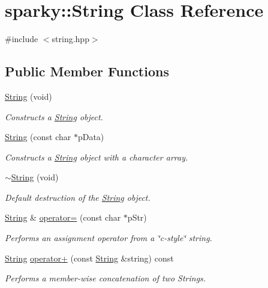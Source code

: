 \hypertarget{classsparky_1_1_string}{}\section{sparky\+:\+:String Class Reference}
\label{classsparky_1_1_string}


{\ttfamily \#include $<$string.\+hpp$>$}

\subsection*{Public Member Functions}
\begin{DoxyCompactItemize}
\item 
\hyperlink{classsparky_1_1_string_a38da9e602dbeac384079afa8fc742fbe}{String} (void)
\begin{DoxyCompactList}\small\item\em Constructs a \hyperlink{classsparky_1_1_string}{String} object. \end{DoxyCompactList}\item 
\hyperlink{classsparky_1_1_string_adb30167da4c60cb2bc3f2309f0aeba1c}{String} (const char $\ast$p\+Data)
\begin{DoxyCompactList}\small\item\em Constructs a \hyperlink{classsparky_1_1_string}{String} object with a character array. \end{DoxyCompactList}\item 
\hyperlink{classsparky_1_1_string_a3141c673c0264aef6e8b5da142ceea2d}{$\sim$\+String} (void)
\begin{DoxyCompactList}\small\item\em Default destruction of the \hyperlink{classsparky_1_1_string}{String} object. \end{DoxyCompactList}\item 
\hyperlink{classsparky_1_1_string}{String} \& \hyperlink{classsparky_1_1_string_a51055cba7899b8b11fc5ecf616410b1c}{operator=} (const char $\ast$p\+Str)
\begin{DoxyCompactList}\small\item\em Performs an assignment operator from a \char`\"{}c-\/style\char`\"{} string. \end{DoxyCompactList}\item 
\hyperlink{classsparky_1_1_string}{String} \hyperlink{classsparky_1_1_string_ab9a54554e4181c04423d5b207223a3a8}{operator+} (const \hyperlink{classsparky_1_1_string}{String} \&string) const 
\begin{DoxyCompactList}\small\item\em Performs a member-\/wise concatenation of two Strings. \end{DoxyCompactList}\item 

\end{DoxyCompactItemize}
